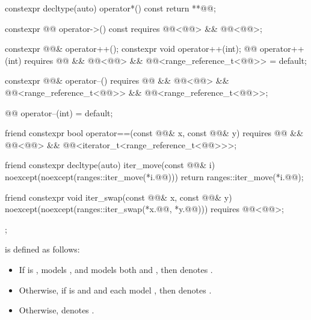 \begin{codeblock}
{{    constexpr decltype(auto) operator*() const { return **@@; }

    constexpr @@ operator->() const
      requires @@<@@> && @@<@@>;

    constexpr @@& operator++();
    constexpr void operator++(int);
    @@ operator++(int)
      requires @@ && @@<@@> &&
               @@<range_reference_t<@@>> = default;

    constexpr @@& operator--()
      requires @@ && @@<@@> &&
               @@<range_reference_t<@@>> &&
               @@<range_reference_t<@@>>;

    @@ operator--(int) = default;

    friend constexpr bool operator==(const @@& x, const @@& y)
      requires @@ && @@<@@> &&
               @@<iterator_t<range_reference_t<@@>>>;

    friend constexpr decltype(auto) iter_move(const @@& i)
    noexcept(noexcept(ranges::iter_move(*i.@@))) {
      return ranges::iter_move(*i.@@);
    }

    friend constexpr void iter_swap(const @@& x, const @@& y)
      noexcept(noexcept(ranges::iter_swap(*x.@@, *y.@@)))
      requires @@<@@>;
  };
}
\end{codeblock}

\pnum
{} is defined as follows:
\begin{itemize}
\item If  is ,
   models , and
   models
  both  and ,
  then  denotes .
\item Otherwise, if  is  and
   and 
  each model , then  denotes
  .
\item Otherwise,  denotes .
\end{itemize}

